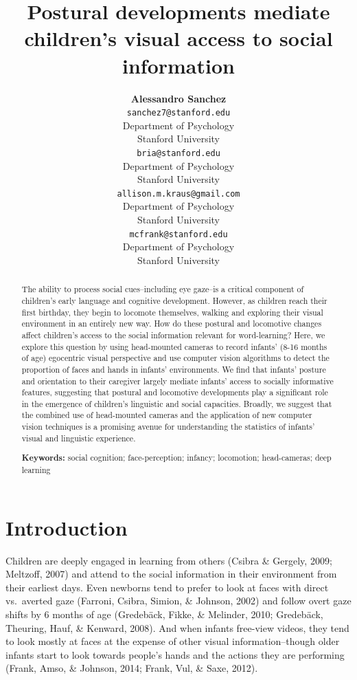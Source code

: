 \documentclass[10pt, letterpaper]{article}
\title{Postural developments mediate children's visual access to social
information}
\author{{\large \bf Alessandro Sanchez} \\ \texttt{sanchez7@stanford.edu} \\ Department of Psychology \\ Stanford University \And {\large \bf Bria Long} \\ \texttt{bria@stanford.edu} \\ Department of Psychology \\ Stanford University \And {\large \bf Ally Kraus} \\ \texttt{allison.m.kraus@gmail.com} \\ Department of Psychology \\ Stanford University \And {\large \bf Michael C. Frank} \\ \texttt{mcfrank@stanford.edu} \\ Department of Psychology \\ Stanford University}
\begin{document}
\maketitle

\begin{abstract}
The ability to process social cues--including eye gaze--is a critical
component of children's early language and cognitive development.
However, as children reach their first birthday, they begin to locomote
themselves, walking and exploring their visual environment in an
entirely new way. How do these postural and locomotive changes affect
children's access to the social information relevant for word-learning?
Here, we explore this question by using head-mounted cameras to record
infants' (8-16 months of age) egocentric visual perspective and use
computer vision algorithms to detect the proportion of faces and hands
in infants' environments. We find that infants' posture and orientation
to their caregiver largely mediate infants' access to socially
informative features, suggesting that postural and locomotive
developments play a significant role in the emergence of children's
linguistic and social capacities. Broadly, we suggest that the combined
use of head-mounted cameras and the application of new computer vision
techniques is a promising avenue for understanding the statistics of
infants' visual and linguistic experience.

\textbf{Keywords:}
social cognition; face-perception; infancy; locomotion; head-cameras;
deep learning
\end{abstract}

\section{Introduction}\label{introduction}

Children are deeply engaged in learning from others (Csibra \& Gergely,
2009; Meltzoff, 2007) and attend to the social information in their
environment from their earliest days. Even newborns tend to prefer to
look at faces with direct vs.~averted gaze (Farroni, Csibra, Simion, \&
Johnson, 2002) and follow overt gaze shifts by 6 months of age
(Gredebäck, Fikke, \& Melinder, 2010; Gredebäck, Theuring, Hauf, \&
Kenward, 2008). And when infants free-view videos, they tend to look
mostly at faces at the expense of other visual information--though older
infants start to look towards people's hands and the actions they are
performing (Frank, Amso, \& Johnson, 2014; Frank, Vul, \& Saxe, 2012).
\end{document}
